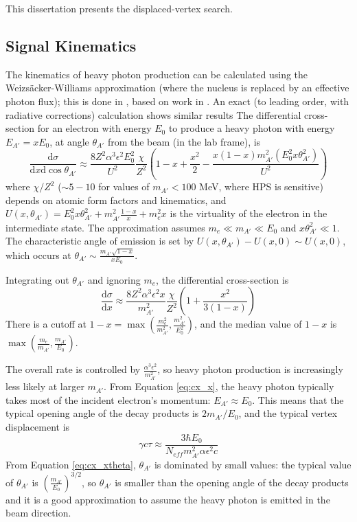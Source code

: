 This dissertation presents the displaced-vertex search.

\subsection{Signal Kinematics}
\label{sec:signal_kinematics}
The kinematics of heavy photon production can be calculated using the Weizs{\"a}cker-Williams approximation (where the nucleus is replaced by an effective photon flux); this is done in \cite{bjorken_new_2009}, based on work in \cite{tsai_pair_1974,tsai_axion_1986}.
An exact (to leading order, with radiative corrections) calculation shows similar results \cite{beranek_theoretical_2013,beranek_study_2014}
The differential cross-section for an electron with energy $E_0$ to produce a heavy photon with energy $E_{A'}=xE_0$, at angle $\theta_{A'}$ from the beam (in the lab frame), is
\begin{equation}
    \frac{\mathrm{d}\sigma}{\mathrm{d}x \mathrm{d}\cos \theta_{A'}} \approx \frac{8 Z^2 \alpha^3\epsilon^2E_0^2}{U^2} \frac{\chi}{Z^2} \left( 1-x+\frac{x^2}{2} - \frac{x(1-x)m^2_{A'} (E_0^2 x \theta_{A'}^2)}{U^2} \right)
    \label{eq:cx_xtheta}
\end{equation}
where $\chi/Z^2$ ($\sim 5-10$ for values of $m_{A'}<100$ MeV, where HPS is sensitive) depends on atomic form factors and kinematics, and $U(x,\theta_{A'}) = E_0^2x\theta_{A'}^2 + m_{A'}^2\frac{1-x}{x} + m_e^2 x$ is the virtuality of the electron in the intermediate state.
The approximation assumes $m_e \ll m_{A'} \ll E_0$ and $x\theta_{A'}^2 \ll 1$.
The characteristic angle of emission is set by $U(x,\theta_{A'})-U(x,0)\sim U(x,0)$, which occurs at $\theta_{A'}\sim \frac{m_{A'}\sqrt{1-x}}{xE_0}$.

Integrating out $\theta_{A'}$ and ignoring $m_e$, the differential cross-section is
\begin{equation}
    \frac{\mathrm{d}\sigma}{\mathrm{d}x} \approx \frac{8 Z^2 \alpha^3\epsilon^2 x}{m_{A'}^2} \frac{\chi}{Z^2} \left( 1 + \frac{x^2}{3(1-x)} \right)
    \label{eq:cx_x}
\end{equation}
There is a cutoff at $1-x = \max \left(\frac{m_e^2}{m_{A'}^2},\frac{m_{A'}^2}{E_0^2} \right)$, and the median value of $1-x$ is $\max \left(\frac{m_e}{m_{A'}},\frac{m_{A'}}{E_0} \right)$.

The overall rate is controlled by $\frac{\alpha^3\epsilon^2}{m_{A'}^2}$, so heavy photon production is increasingly less likely at larger $m_{A'}$.
From Equation \ref{eq:cx_x}, the heavy photon typically takes most of the incident electron's momentum: $E_{A'}\approx E_0$.
This means that the typical opening angle of the decay products is $2m_{A'}/E_0$, and the typical vertex displacement is
\begin{equation}
    \gamma c\tau \approx \frac{3\hbar E_0}{N_{eff}m_{A'}^2\alpha\epsilon^2 c}
\end{equation}
From Equation \ref{eq:cx_xtheta}, $\theta_{A'}$ is dominated by small values: the typical value of $\theta_{A'}$ is $\left(\frac{m_{A'}}{E_0}\right)^{3/2}$, so $\theta_{A'}$ is smaller than the opening angle of the decay products and it is a good approximation to assume the heavy photon is emitted in the beam direction.

